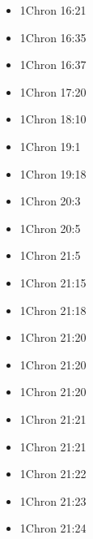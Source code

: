 \documentclass[14pt]{book}
\begin{document}
\begin{multicols}{2}
\begin{itemize}
						\item 1Chron 16:21
						
						\item 1Chron 16:35
						
						\item 1Chron 16:37
						
						\item 1Chron 17:20
						
						\item 1Chron 18:10
						
						\item 1Chron 19:1
						
						\item 1Chron 19:18
						
						\item 1Chron 20:3
						
						\item 1Chron 20:5
						
						\item 1Chron 21:5
						
						\item 1Chron 21:15
						
						\item 1Chron 21:18
						
						\item 1Chron 21:20
						
						\item 1Chron 21:20
						
						\item 1Chron 21:20
						
						\item 1Chron 21:21
						
						\item 1Chron 21:21
						
						\item 1Chron 21:22
						
						\item 1Chron 21:23
						
						\item 1Chron 21:24
						

\end{itemize}
\end{multicols}
\end{document}
